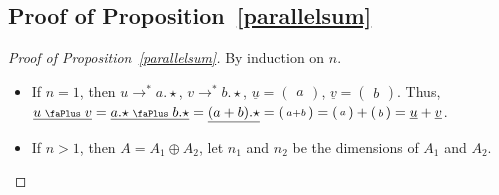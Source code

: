 \documentclass[screen, sigconf,authorversion,nonacm]{acmart}
\theoremstyle{acmdefinition}
\numberwithin{equation}{section}
\newcommand\plus{\mathrel{\text{\normalfont\scalebox{0.7}{\faPlus}}}}
\newcommand\lra{\longrightarrow}
\begin{document}
\subsection{Proof of Proposition~\ref{parallelsum}}
\begin{proof}[Proof of Proposition~\ref{parallelsum}]
  By induction on $n$. 

  \begin{itemize}
    \item 
      If $n = 1$, then $u \lra^* a.\star$, $v \lra^* b.\star$, $\underline{u} =
      \left(\begin{smallmatrix} a \end{smallmatrix}\right)$, $\underline{v}
      = \left(\begin{smallmatrix} b \end{smallmatrix}\right)$.  Thus,
      $\underline{u \plus v} = \underline{{a.\star} \plus b.\star} =
      \underline{(a + b).\star} = \left(\begin{smallmatrix} a +
      b \end{smallmatrix}\right) = \left(\begin{smallmatrix}
      a \end{smallmatrix}\right) + \left(\begin{smallmatrix}
      b \end{smallmatrix}\right) = \underline {u} + \underline{v}$.

    \item 
      If $n > 1$, then $A = A_1 \oplus A_2$, let $n_1$ and $n_2$ be the
      dimensions of $A_1$ and $A_2$.


\end{itemize}
\end{proof}
\end{document}
